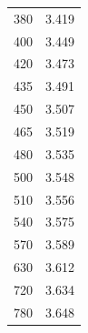 \documentclass[titlepage]{article}
\begin{document}
\begin{minipage}[h]{0.5\textwidth}
\begin{tabular}{c|c}
			380 & 3.419  \\
			400 & 3.449  \\
			420 & 3.473  \\
			435 & 3.491  \\
			450 & 3.507  \\
			465 & 3.519  \\
			480 & 3.535  \\
			500 & 3.548 \\
			510 & 3.556 \\
			540 & 3.575 \\
			570 & 3.589 \\
			630 & 3.612 \\
			720 & 3.634 \\
			780 & 3.648
		\end{tabular}
		\vspace{14.8cm}
	\end{minipage}
\end{document}
